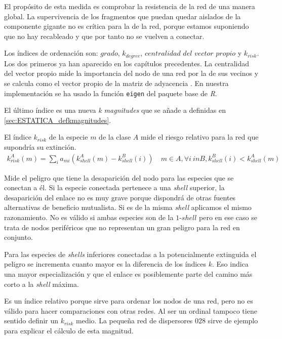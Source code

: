 El propósito de esta medida es comprobar la resistencia de la red de una manera global. La supervivencia de los fragmentos que puedan quedar aislados de la componente gigante no es crítica para la de la red, porque estamos suponiendo que no hay recableado y que por tanto no se vuelven a conectar.

Los índices de ordenación son: $grado$, ${k}_{degree}$, $centralidad$ $del$ $vector$ $propio$ y ${k}_{risk}$. Los dos primeros ya han aparecido en los capítulos precedentes. La centralidad del vector propio mide la importancia del nodo de una red por la de sus vecinos y se calcula como el vector propio de la matriz de adyacencia \cite{newman2008mathematics}. En nuestra implementación se ha usado la función \texttt{eigen} del paquete base de \textit{R}.

El último índice es una nueva \textit{k magnitudes} que se añade a definidas en \ref{sec:ESTATICA_defkmagnitudes}. 

\begin{theo} 
El índice \textit{$k_{risk}$} de la especie $m$ de la clase $A$ mide el riesgo relativo para la red que supondría su extinción.
\begin{align*}
k^A_{risk}\left(m\right) = \sum\limits_{i} a_{mi} \left(k^A_{shell}\left(m\right) - k^B_{shell}\left(i\right)\right)\quad   m \in A, \forall i\: in B, k^B_{shell}\left(i\right) < k^A_{shell}\left(m\right)
\end{align*}
\label{krisk}
\end{theo}

Mide el peligro que tiene la desaparición del nodo para las especies que se conectan a él. Si la especie conectada pertenece a una \textit{shell} superior, la desaparición del enlace no es muy grave porque dispondrá de otras fuentes alternativas de beneficio mutualista. Si es de la misma \textit{shell} aplicamos el mismo razonamiento. No es válido si ambas especies son de la $1$-$shell$ pero en ese caso se trata de nodos periféricos que no representan un gran peligro para la red en conjunto.

Para las especies de \textit{shells} inferiores conectadas a la potencialmente extinguida el peligro se incrementa cuanto mayor es la diferencia de los índices $k$. Eso indica una mayor especialización y que el enlace es posiblemente parte del camino más corto a la \textit{shell} máxima.

Es un índice relativo porque sirve para ordenar los nodos de una red, pero no es válido para hacer comparaciones con otras redes. Al ser un ordinal tampoco tiene sentido definir un $k_{risk}$ medio. La pequeña red de dispersores $028$ sirve de ejemplo para explicar el cálculo de esta magnitud.

